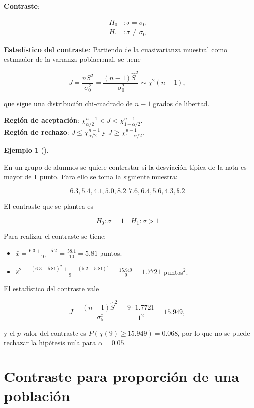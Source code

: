 \documentclass[
  spanish,
  a4paper,
]{scrreport}
\providecommand{\tightlist}{%
  \setlength{\itemsep}{0pt}\setlength{\parskip}{0pt}}
\theoremstyle{plain}
\theoremstyle{definition}
\newtheorem{example}{Ejemplo}[chapter]
\theoremstyle{definition}
\theoremstyle{remark}
\begin{document}
\textbf{Contraste}:

\begin{align*}
H_0 &: \sigma=\sigma_0 \\
H_1 &: \sigma\neq \sigma_0
\end{align*}

\textbf{Estadístico del contraste}: Partiendo de la cuasivarianza
muestral como estimador de la varianza poblacional, se tiene

\[
J=\frac{nS^2}{\sigma_0^2} = \frac{(n-1)\hat{S}^2}{\sigma_0^2}\sim \chi^2(n-1),
\]

que sigue una distribución chi-cuadrado de \(n-1\) grados de libertad.

\textbf{Región de aceptación}:
\(\chi_{\alpha/2}^{n-1} < J < \chi_{1-\alpha/2}^{n-1}\).\\
\textbf{Región de rechazo}: \(J\leq \chi_{\alpha/2}^{n-1}\) y
\(J\geq \chi_{1-\alpha/2}^{n-1}\).

\begin{example}[]\protect\hypertarget{exm-contraste-varianza}{}\label{exm-contraste-varianza}

En un grupo de alumnos se quiere contrastar si la desviación típica de
la nota es mayor de 1 punto. Para ello se toma la siguiente muestra:

\[
6.3, 5.4, 4.1, 5.0, 8.2, 7.6, 6.4, 5.6, 4.3, 5.2
\]

El contraste que se plantea es

\[
H_0: \sigma=1 \quad H_1: \sigma>1
\]

Para realizar el contraste se tiene:

\begin{itemize}
\tightlist
\item
  \(\bar x = \frac{6.3+\cdots+5.2}{10}=\frac{58.1}{10}=5.81\) puntos.
\item
  \(\hat s^2 = \frac{(6.3-5.81)^2+\cdots+(5.2-5.81)^2}{9} = \frac{15.949}{9}=1.7721\)
  puntos\(^2\).
\end{itemize}

El estadístico del contraste vale

\[
J= \frac{(n-1)\hat{S}^2}{\sigma_0^2} = \frac{9\cdot1.7721}{1^2} = 15.949,
\]

y el \(p\)-valor del contraste es \(P(\chi(9)\geq 15.949) = 0.068\), por
lo que no se puede rechazar la hipótesis nula para \(\alpha=0.05\).

\end{example}

\section{Contraste para proporción de una
población}\label{contraste-para-proporciuxf3n-de-una-poblaciuxf3n}
\end{document}
